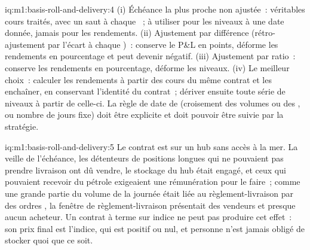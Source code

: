 \begin{solution}{iq:m1:basis-roll-and-delivery:4}
(i) Échéance la plus proche non ajustée~: véritables cours traités, avec un saut à chaque ~; à utiliser
pour les niveaux à une date donnée, jamais pour les rendements. (ii) Ajustement par différence
(rétro-ajustement par l'écart à chaque )~: conserve le P\&L en points, déforme les rendements
en pourcentage et peut devenir négatif. (iii) Ajustement par ratio~: conserve les rendements
en pourcentage, déforme les niveaux. (iv) Le meilleur choix~: calculer les rendements à partir
des cours du même contrat et les enchaîner, en conservant l'identité du contrat~; dériver ensuite
toute série de niveaux à partir de celle-ci. La règle de date de  (croisement des volumes ou
des , ou nombre de jours fixe) doit être explicite et doit pouvoir être suivie
par la stratégie.
\end{solution}

\begin{solution}{iq:m1:basis-roll-and-delivery:5}
Le contrat est  sur un hub sans accès à la mer. La veille de l'échéance, les détenteurs
de positions longues qui ne pouvaient pas prendre livraison ont dû vendre, le stockage du hub était engagé,
et ceux qui pouvaient recevoir du pétrole exigeaient une rémunération pour le faire~; comme une grande partie
du volume de la journée était liée au règlement-livraison par des ordres , la fenêtre de
règlement-livraison présentait des vendeurs et presque aucun acheteur. Un contrat à terme sur indice 
ne peut pas produire cet effet~: son prix final est l'indice, qui est positif ou nul, et personne n'est jamais obligé
de stocker quoi que ce soit.
\end{solution}


